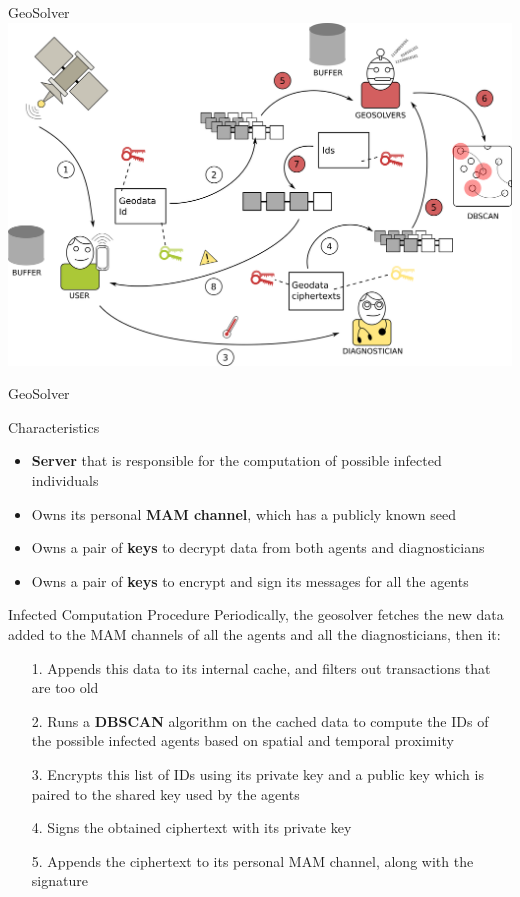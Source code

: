 \begin{frame}{GeoSolver}
    \centering
    \includegraphics[width=0.95\linewidth]{images/design_geosolver.png}
\end{frame}

\begin{frame}{GeoSolver}
    \begin{block}{Characteristics}
        \begin{itemize}
            \item \textbf{Server} that is responsible for the computation of possible infected individuals
            \item Owns its personal \textbf{MAM channel}, which has a publicly known seed
            \item Owns a pair of \textbf{keys} to decrypt data from both agents and diagnosticians
            \item Owns a pair of \textbf{keys} to encrypt and sign its messages for all the agents
        \end{itemize}
    \end{block}
    
    \vspace{-3pt}
    
    \begin{block}{Infected Computation Procedure}
        Periodically, the geosolver fetches the new data added to the MAM channels of all the agents and all the diagnosticians, then it:
        \begin{itemize}
            \item [1.] Appends this data to its internal cache, and filters out transactions that are too old
            \item [2.] Runs a \textbf{DBSCAN} algorithm on the cached data to compute the IDs of the possible infected agents based on spatial and temporal proximity
            \item [3.] Encrypts this list of IDs using its private key and a public key which is paired to the shared key used by the agents
            \item [4.] Signs the obtained ciphertext with its private key
            \item [5.] Appends the ciphertext to its personal MAM channel, along with the signature
        \end{itemize}
    \end{block}
\end{frame}


